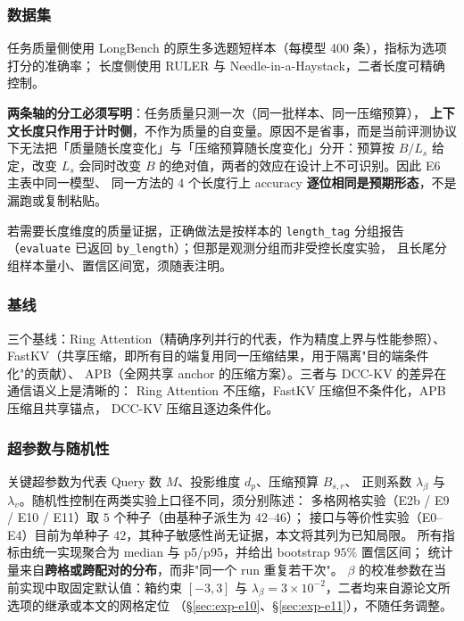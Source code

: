 \subsubsection{数据集}

任务质量侧使用 LongBench 的原生多选题短样本（每模型 400 条），指标为选项打分的准确率；
长度侧使用 RULER 与 Needle-in-a-Haystack，二者长度可精确控制。

\textbf{两条轴的分工必须写明}：任务质量只测一次（同一批样本、同一压缩预算），
\textbf{上下文长度只作用于计时侧}，不作为质量的自变量。原因不是省事，而是当前评测协议
下无法把「质量随长度变化」与「压缩预算随长度变化」分开：预算按 $B/L_s$ 给定，改变
$L_s$ 会同时改变 $B$ 的绝对值，两者的效应在设计上不可识别。因此 E6 主表中同一模型、
同一方法的 4 个长度行上 accuracy \textbf{逐位相同是预期形态}，不是漏跑或复制粘贴。

若需要长度维度的质量证据，正确做法是按样本的 \texttt{length\_}\allowbreak\texttt{tag} 分组报告
（\texttt{evaluate} 已返回 \texttt{by\_length}）；但那是观测分组而非受控长度实验，
且长尾分组样本量小、置信区间宽，须随表注明。

\subsubsection{基线}

三个基线：Ring Attention（精确序列并行的代表，作为精度上界与性能参照）、
FastKV（共享压缩，即所有目的端复用同一压缩结果，用于隔离"目的端条件化"的贡献）、
APB（全网共享 anchor 的压缩方案）。三者与 DCC-KV 的差异在通信语义上是清晰的：
Ring Attention 不压缩，FastKV 压缩但不条件化，APB 压缩且共享锚点，
DCC-KV 压缩且逐边条件化。

\subsubsection{超参数与随机性}

关键超参数为代表 Query 数 $M$、投影维度 $d_p$、压缩预算 $B_{s,r}$、
正则系数 $\lambda_\beta$ 与 $\lambda_v$。随机性控制在两类实验上口径不同，须分别陈述：
多格网格实验（E2b / E9 / E10 / E11）取 $5$ 个种子（由基种子派生为 $42$--$46$）；
接口与等价性实验（E0--E4）目前为单种子 $42$，其种子敏感性尚无证据，本文将其列为已知局限。
所有指标由统一实现聚合为 median 与 p5/p95，并给出 bootstrap $95\%$ 置信区间；
统计量来自\textbf{跨格或跨配对的分布}，而非"同一个 run 重复若干次"。
$\beta$ 的校准参数在当前实现中取固定默认值：箱约束 $[-3,3]$ 与
$\lambda_\beta=3\times10^{-2}$，二者均来自源论文所选项的继承或本文的网格定位
（\S\ref{sec:exp-e10}、\S\ref{sec:exp-e11}），不随任务调整。

